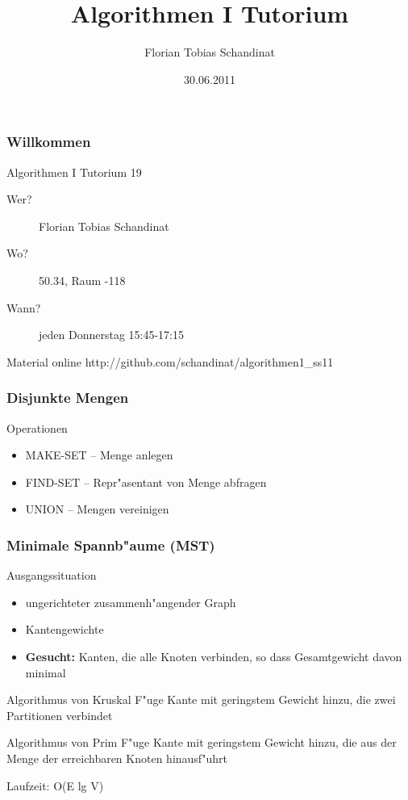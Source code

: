 \documentclass{beamer}
\title{Algorithmen I Tutorium}
\author{Florian Tobias Schandinat}
\date{30.06.2011}
\institute{FTS}
\begin{document}
\begin{frame}
\frametitle{Willkommen}
\begin{block}{Algorithmen I Tutorium 19}
\begin{description}
\item[Wer?] Florian Tobias Schandinat\\
\item[Wo?] 50.34, Raum -118\\
\item[Wann?] jeden Donnerstag 15:45-17:15
\end{description}
\end{block}

\begin{block}{Material online}
http://github.com/schandinat/algorithmen1\_ss11
\end{block}
\end{frame}


\begin{frame}
\frametitle{Disjunkte Mengen}

\begin{block}{Operationen}
\begin{itemize}
\item MAKE-SET -- Menge anlegen
\item FIND-SET -- Repr"asentant von Menge abfragen
\item UNION -- Mengen vereinigen
\end{itemize}
\end{block}
\end{frame}


\begin{frame}
\frametitle{Minimale Spannb"aume (MST)}

\begin{block}{Ausgangssituation}
\begin{itemize}
\item ungerichteter zusammenh"angender Graph
\item Kantengewichte
\item \textbf{Gesucht:} Kanten, die alle Knoten verbinden, so dass Gesamtgewicht davon minimal
\end{itemize}
\end{block}

\pause

\begin{alertblock}{Algorithmus von Kruskal}
F"uge Kante mit geringstem Gewicht hinzu, die zwei Partitionen verbindet
\end{alertblock}


\begin{alertblock}{Algorithmus von Prim}
F"uge Kante mit geringstem Gewicht hinzu, die aus der Menge der erreichbaren Knoten hinausf"uhrt
\end{alertblock}


\begin{block}{}
Laufzeit: O(E lg V)
\end{block}
\end{frame}
\end{document}
